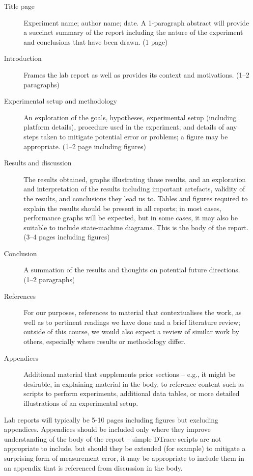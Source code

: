 \documentclass[a4paper,10pt]{article}
\begin{document}
\begin{description}
\item[Title page] Experiment name; author name; date.
  A 1-paragraph abstract will provide a succinct summary of the report
  including the nature of the experiment and conclusions that have been drawn.
  (1 page)
\item[Introduction] Frames the lab report as well as provides its context and
  motivations. (1--2 paragraphs)
\item[Experimental setup and methodology] An exploration of the goals,
  hypotheses, experimental setup (including platform details), procedure
  used in the experiment, and details of any steps taken to mitigate potential
  error or problems; a figure may be appropriate. (1--2 page including
  figures)
\item[Results and discussion]
  The results obtained, graphs illustrating those results, and an exploration
  and interpretation of the results including important artefacts, validity of
  the results, and conclusions they lead us to.
  Tables and figures required to explain the results should be present in all
  reports; in most cases, performance graphs will be expected, but in some
  cases, it may also be suitable to include state-machine diagrams.
  This is the body of the report. (3--4 pages including figures)
\item[Conclusion]
  A summation of the results and thoughts on potential future directions.
  (1--2 paragraphs)
\item[References]
  For our purposes, references to material that contextualises the work, as
  well as to pertinent readings we have done and a brief literature review;
  outside of this course, we would also expect a review of similar work by
  others, especially where results or methodology differ.
\item[Appendices]
  Additional material that supplements prior sections -- e.g., it might be
  desirable, in explaining material in the body, to reference content such as
  scripts to perform experiments, additional data tables, or more detailed
  illustrations of an experimental setup.
\end{description}

Lab reports will typically be 5-10 pages including figures but excluding
appendices.
Appendices should be included only where they improve understanding of the
body of the report -- simple DTrace scripts are not appropriate to include,
but should they be extended (for example) to mitigate a surprising form of
measurement error, it may be appropriate to include them in an appendix that
is referenced from discussion in the body.
\end{document}
